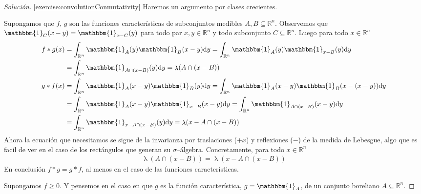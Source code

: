 \documentclass{article}
\newcommand{\characteristic}{\mathbbm{1}}
\newcommand{\realNumbers}{\mathbb{R}}
\DeclareMathOperator{\lebesgueMeasure}{\lambda}
\theoremstyle{remark}
\begin{document}
  \begin{proof}[Solución]
    \ref{exercise:convolutionConmutativity}
    Haremos un argumento por clases crecientes.

    Supongamos que \(f\), \(g\) son las funciones características de subconjuntos medibles \(A, B \subseteq \realNumbers^n\).
    Observemos que \(\characteristic_C (x - y) = \characteristic_{x - C} (y)\) para todo par \(x, y \in \realNumbers^n\) y todo subconjunto \(C \subseteq \realNumbers^n\).
    Luego para todo \(x \in \realNumbers^n\)
    \begin{align}
      f * g (x)
      &=
      \int_{\realNumbers^n} \characteristic_A(y) \characteristic_B(x - y) \dd y
      =
      \int_{\realNumbers^n} \characteristic_A(y) \characteristic_{x - B} (y) \dd y
      \\
      &=
      \int_{\realNumbers^n} \characteristic_{A \cap (x - B)}(y) \dd y
      =
      \lebesgueMeasure(A \cap (x - B))
      \\
      g * f(x)
      &=
      \int_{\realNumbers^n} \characteristic_A(x - y) \characteristic_B(y) \dd y
      =
      \int_{\realNumbers^n} \characteristic_A(x - y) \characteristic_B(x - (x - y)) \dd y
      \\
      &=
      \int_{\realNumbers^n} \characteristic_A(x - y) \characteristic_{x - B} (x - y) \dd y
      =
      \int_{\realNumbers^n} \characteristic_{A \cap (x - B)}(x - y) \dd y
      \\
      &=
      \int_{\realNumbers^n} \characteristic_{x - A \cap (x - B)}(y) \dd y
      =
      \lebesgueMeasure(x - A \cap (x - B))
    \end{align}
    Ahora la ecuación que necesitamos se sigue de la invarianza por traslaciones (\(+ x\)) y reflexiones (\(-\)) de la medida de Lebesgue, algo que es facil de ver en el caso de los rectángulos que generan su \(\sigma\)--álgebra.
    Concretamente, para todo \(x \in \realNumbers^n\)
    \begin{align}
      \lebesgueMeasure(A \cap (x - B))
      =
      \lebesgueMeasure(x - A \cap (x - B))
    \end{align}
    En conclusión \(f * g = g * f\), al menos en el caso de las funciones características.
    
    Supongamos \(f \geq 0\).
    Y pensemos en el caso en que \(g\) es la función característica, \(g = \characteristic_A\), de un conjunto boreliano \(A \subseteq \realNumbers^n\).
    

\end{proof}
\end{document}
